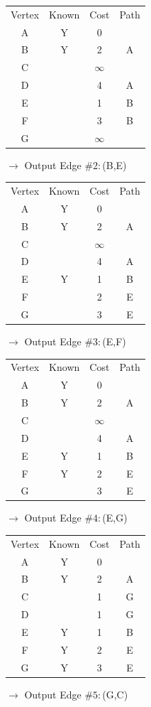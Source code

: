 \documentclass[12pt]{exam}
\begin{document}
\begin{questions}
\begin{parts}
\begin{tabular}{|c c c c|}
\hline
Vertex & Known & Cost & Path \\
A & Y & 0 & \\
B & Y & 2 & A \\
C & & $\infty$ & \\
D & & 4 & A \\
E & & 1 & B \\
F & & 3 & B \\
G & & $\infty$ & \\
\hline
\end{tabular}
$\rightarrow$ Output Edge $\#2:$(B,E) 

\begin{tabular}{|c c c c|}
\hline
Vertex & Known & Cost & Path \\
A & Y & 0 & \\
B & Y & 2 & A \\
C & & $\infty$ & \\
D & & 4 & A \\
E & Y & 1 & B \\
F & & 2 & E \\
G & & 3 & E \\
\hline
\end{tabular}
$\rightarrow$ Output Edge $\#3:$(E,F) 

\begin{tabular}{|c c c c|}
\hline
Vertex & Known & Cost & Path \\
A & Y & 0 & \\
B & Y & 2 & A \\
C & & $\infty$ & \\
D & & 4 & A \\
E & Y & 1 & B \\
F & Y & 2 & E \\
G & & 3 & E \\
\hline
\end{tabular}
$\rightarrow$ Output Edge $\#4:$(E,G) 

\begin{tabular}{|c c c c|}
\hline
Vertex & Known & Cost & Path \\
A & Y & 0 & \\
B & Y & 2 & A \\
C & & 1 & G \\
D & & 1 & G \\
E & Y & 1 & B \\
F & Y & 2 & E \\
G & Y & 3 & E \\
\hline
\end{tabular}
$\rightarrow$ Output Edge $\#5:$(G,C) 


\end{parts}
\end{questions}
\end{document}
